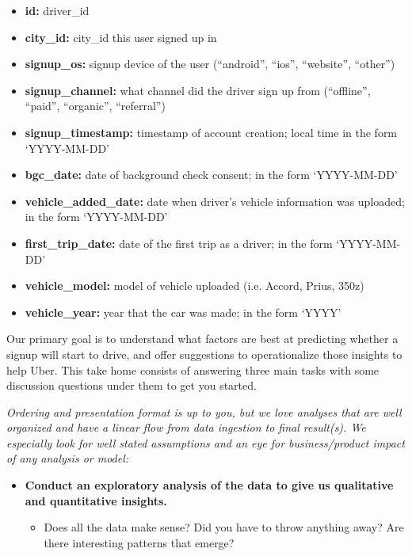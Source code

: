 \documentclass[11pt]{article}
\providecommand{\tightlist}{%
      \setlength{\itemsep}{0pt}\setlength{\parskip}{0pt}}
\begin{document}
\begin{itemize}
\tightlist
\item
  \textbf{id:} driver\_id
\item
  \textbf{city\_id:} city\_id this user signed up in
\item
  \textbf{signup\_os:} signup device of the user (``android'', ``ios'',
  ``website'', ``other'')
\item
  \textbf{signup\_channel:} what channel did the driver sign up from
  (``offline'', ``paid'', ``organic'', ``referral'')
\item
  \textbf{signup\_timestamp:} timestamp of account creation; local time
  in the form `YYYY-MM-DD'
\item
  \textbf{bgc\_date:} date of background check consent; in the form
  `YYYY-MM-DD'
\item
  \textbf{vehicle\_added\_date:} date when driver's vehicle information
  was uploaded; in the form `YYYY-MM-DD'
\item
  \textbf{first\_trip\_date:} date of the first trip as a driver; in the
  form `YYYY-MM-DD'
\item
  \textbf{vehicle\_model:} model of vehicle uploaded (i.e. Accord,
  Prius, 350z)
\item
  \textbf{vehicle\_year:} year that the car was made; in the form `YYYY'
\end{itemize}

Our primary goal is to understand what factors are best at predicting
whether a signup will start to drive, and offer suggestions to
operationalize those insights to help Uber. This take home consists of
answering three main tasks with some discussion questions under them to
get you started.

\emph{Ordering and presentation format is up to you, but we love
analyses that are well organized and have a linear flow from data
ingestion to final result(s). We especially look for well stated
assumptions and an eye for business/product impact of any analysis or
model:}

\begin{itemize}
\tightlist
\item
  \textbf{Conduct an exploratory analysis of the data to give us
  qualitative and quantitative insights.}

  \begin{itemize}
  \tightlist
  \item
    Does all the data make sense? Did you have to throw anything away?
    Are there interesting patterns that emerge?
  \end{itemize}
\end{itemize}
\end{document}
